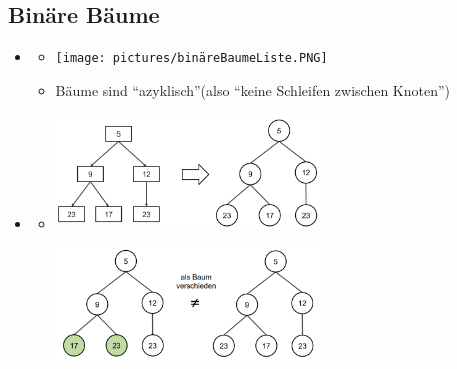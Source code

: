 \documentclass[
    12pt,
    a4paper,
    ngerman,
    color=3b,%
    marginpar=false,
    colorback=false,
    leqno,
]{tudaexercise}
\begin{document}
\subsection{Binäre Bäume}\label{Binaere Baeume}
\begin{itemize}
    \item {}
          \begin{itemize}
              \item[] \texttt{[image: pictures/binäreBaumeListe.PNG]}
              \item[] Bäume sind "`azyklisch"'(also "`keine Schleifen zwischen Knoten"')
          \end{itemize}

    \item {}
          \begin{itemize}
              \item[]
                    \begin{minipage}[t]{0.45\textwidth}
                        \includegraphics[width=7cm]{pictures/baumGraph1.PNG}
                    \end{minipage}
                    \begin{minipage}[t]{0.45\textwidth}
                        \includegraphics[width=7cm]{pictures/baumGraph2.PNG}
                    \end{minipage}
          \end{itemize}


\end{itemize}
\end{document}
